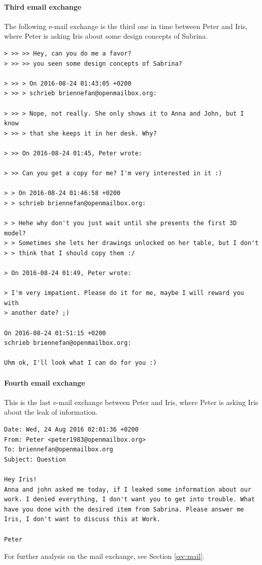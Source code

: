 \documentclass[12pt]{article}
\begin{document}
\paragraph{Third email exchange}
The following e-mail exchange is the third one in time between Peter and Iris, where Peter is asking Iris about some design concepts of Sabrina.

\begin{shaded}
\begin{verbatim}
> >> >> Hey, can you do me a favor?
> >> >> you seen some design concepts of Sabrina?

> >> > On 2016-08-24 01:43:05 +0200
> >> > schrieb briennefan@openmailbox.org:

> >> > Nope, not really. She only shows it to Anna and John, but I know
> >> > that she keeps it in her desk. Why?

> >> On 2016-08-24 01:45, Peter wrote:

> >> Can you get a copy for me? I'm very interested in it :)

> > On 2016-08-24 01:46:58 +0200
> > schrieb briennefan@openmailbox.org:

> > Hehe why don't you just wait until she presents the first 3D model?
> > Sometimes she lets her drawings unlocked on her table, but I don't
> > think that I should copy them :/

> On 2016-08-24 01:49, Peter wrote:

> I'm very impatient. Please do it for me, maybe I will reward you with 
> another date? ;)

On 2016-08-24 01:51:15 +0200
schrieb briennefan@openmailbox.org:

Uhm ok, I'll look what I can do for you :)
\end{verbatim}
\end{shaded}

\paragraph{Fourth email exchange}
This is the last e-mail exchange between Peter and Iris, where Peter is asking Iris about the leak of information.

\begin{shaded}
\begin{verbatim}
Date: Wed, 24 Aug 2016 02:01:36 +0200
From: Peter <peter1983@openmailbox.org>
To: briennefan@openmailbox.org
Subject: Question

Hey Iris!
Anna and john asked me today, if I leaked some information about our
work. I denied everything, I don't want you to get into trouble. What
have you done with the desired item from Sabrina. Please answer me
Iris, I don't want to discuss this at Work.

Peter
\end{verbatim}
\end{shaded}
For further analysis on the mail exchange, see Section \ref{sec:mail}.
\end{document}
